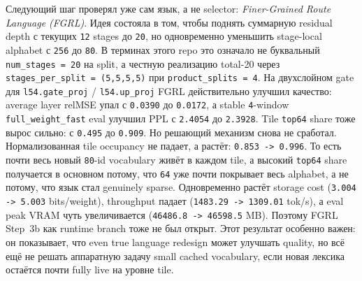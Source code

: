 \begin{itemize}[leftmargin=1.5em]
Следующий шаг проверял уже сам язык, а не selector: \emph{Finer-Grained Route
Language (FGRL)}. Идея состояла в том, чтобы поднять суммарную residual depth
с текущих \texttt{12} stages до \texttt{20}, но одновременно уменьшить
stage-local alphabet с \texttt{256} до \texttt{80}. В терминах этого repo это
означало не буквальный \texttt{num\_stages = 20} на split, а честную
реализацию total-20 через \texttt{stages\_per\_split = (5,5,5,5)} при
\texttt{product\_splits = 4}. На двухслойном gate для
\texttt{l54.gate\_proj} / \texttt{l54.up\_proj} FGRL действительно улучшил
качество: average layer relMSE упал с \texttt{0.0390} до \texttt{0.0172}, а
stable \texttt{4}-window \texttt{full\_weight\_fast} eval улучшил PPL с
\texttt{2.4054} до \texttt{2.3928}. Tile \texttt{top64} share тоже вырос
сильно: с \texttt{0.495} до \texttt{0.909}. Но решающий механизм снова не
сработал. Нормализованная tile occupancy не падает, а растёт:
\texttt{0.853 -> 0.996}. То есть почти весь новый \texttt{80}-id vocabulary
живёт в каждом tile, а высокий \texttt{top64} share получается в основном
потому, что \texttt{64} уже почти покрывает весь alphabet, а не потому, что
язык стал genuinely sparse. Одновременно растёт storage cost
(\texttt{3.004 -> 5.003} bits/weight), throughput падает
(\texttt{1483.29 -> 1309.01} tok/s), а eval peak VRAM чуть увеличивается
(\texttt{46486.8 -> 46598.5} MB). Поэтому FGRL Step~3b как runtime branch тоже
не был открыт. Этот результат особенно важен: он показывает, что even true
language redesign может улучшать quality, но всё ещё не решать аппаратную
задачу small cached vocabulary, если новая лексика остаётся почти fully live
на уровне tile.


\end{itemize}

